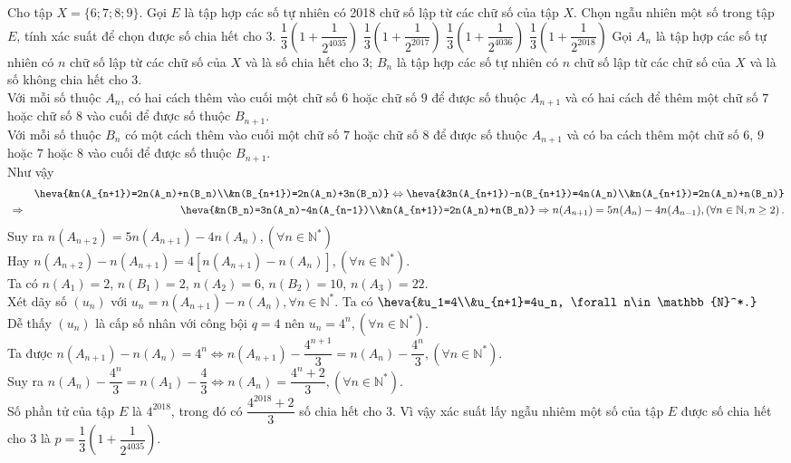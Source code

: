 \begin{ex}%
	Cho tập $X=\{6;7;8;9\}$. Gọi $E$ là tập hợp các số tự nhiên có 2018 chữ số lập từ các chữ số của tập $X$. Chọn ngẫu nhiên một số trong tập $E$, tính xác suất để chọn được số chia hết cho $3$.
	\choice
	{\True $\dfrac{1}{3}\left(1+\dfrac{1}{2^{4035}}\right)$}
	{$\dfrac{1}{3}\left(1+\dfrac{1}{2^{2017}}\right)$}
	{$\dfrac{1}{3}\left(1+\dfrac{1}{2^{4036}}\right)$}
	{$\dfrac{1}{3}\left(1+\dfrac{1}{2^{2018}}\right)$}
	\loigiai
	{Gọi $A_n$ là tập hợp các số tự nhiên có $n$ chữ số lập từ các chữ số của $X$ và là số chia hết cho $3$; $B_n$ là tập hợp các số tự nhiên có $n$ chữ số lập từ các chữ số của $X$ và là số không chia hết cho $3$.\\
		Với mỗi số thuộc $A_n$, có hai cách thêm vào cuối một chữ số $6$ hoặc chữ số $9$ để được số thuộc $A_{n+1}$ và có hai cách để thêm một chữ số $7$ hoặc chữ số $8$ vào cuối để được số thuộc $B_{n+1}$.\\
		Với mỗi số thuộc $B_n$ có một cách thêm vào cuối một chữ số $7$ hoặc chữ số $8$ để được số thuộc $A_{n+1}$ và có ba cách thêm một chữ số $6$, $9$ hoặc $7$ hoặc $8$ vào cuối để được số thuộc $B_{n+1}$.\\
		Như vậy
		\allowdisplaybreaks
		\begin{eqnarray*}
			&&\heva{&n(A_{n+1})=2n(A_n)+n(B_n)\\&n(B_{n+1})=2n(A_n)+3n(B_n)} \Leftrightarrow \heva{&3n(A_{n+1})-n(B_{n+1})=4n(A_n)\\&n(A_{n+1})=2n(A_n)+n(B_n)}\\
			&\Rightarrow& \heva{&n(B_n)=3n(A_n)-4n(A_{n-1})\\&n(A_{n+1})=2n(A_n)+n(B_n)}
			\Rightarrow n(A_{n+1})=5n(A_n)-4n(A_{n-1}), \left(\forall n\in \mathbb{N}, n\geq 2\right).
		\end{eqnarray*}
		Suy ra $n(A_{n+2})=5n(A_{n+1})-4n(A_n), (\forall n\in\mathbb{N}^*)$\\
		Hay $n(A_{n+2})-n(A_{n+1})=4\left[n(A_{n+1})-n(A_n)\right], (\forall n\in\mathbb{N}^*)$.\\
		Ta có $n(A_1)=2$, $n(B_1)=2$, $n(A_2)=6$, $n(B_2)=10$, $n(A_3)=22$.\\
		Xét dãy số $(u_n)$ với $u_n=n(A_{n+1})-n(A_n), \forall n\in\mathbb{N}^*$. Ta có $\heva{&u_1=4\\&u_{n+1}=4u_n, \forall n\in \mathbb{N}^*.}$\\
		Dễ thấy $(u_n)$ là cấp số nhân với công bội $q=4$ nên $u_n=4^n, (\forall n\in\mathbb{N}^*)$.\\
		Ta được $n(A_{n+1})-n(A_n)=4^n \Leftrightarrow n(A_{n+1})-\dfrac{4^{n+1}}{3}=n(A_n)-\dfrac{4^n}{3}, (\forall n\in\mathbb{N}^*)$.\\
		Suy ra $n(A_n)-\dfrac{4^n}{3}=n(A_1)-\dfrac{4}{3} \Leftrightarrow n(A_n)=\dfrac{4^n+2}{3}, (\forall n\in\mathbb{N}^*)$.\\
		Số phần tử của tập $E$ là $4^{2018}$, trong đó có $\dfrac{4^{2018}+2}{3}$ số chia hết cho $3$. Vì vậy xác suất lấy ngẫu nhiêm một số của tập $E$ được số chia hết cho $3$ là $p=\dfrac{1}{3}\left(1+\dfrac{1}{2^{4035}}\right)$.}
\end{ex}%
